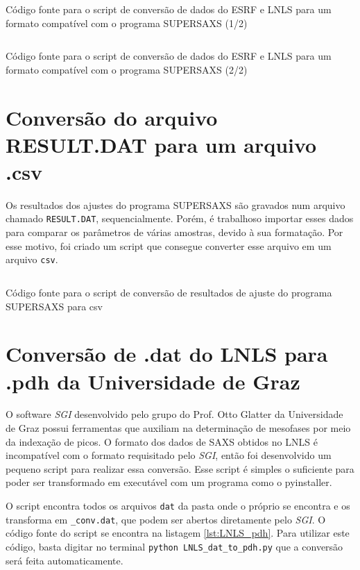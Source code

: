 \begin{apendicesenv}
\begin{listing}[H]
	\inputminted{python}{./python/converting_files1.py}
	\caption{Código fonte para o script de conversão de dados do ESRF e LNLS para um formato compatível com o programa SUPERSAXS (1/2)}  
	\label{lst:conversao_supersaxs1}
\end{listing}

\begin{listing}[H]
	\inputminted{python}{./python/converting_files2.py}
	\caption{Código fonte para o script de conversão de dados do ESRF e LNLS para um formato compatível com o programa SUPERSAXS (2/2)}  
	\label{lst:conversao_supersaxs2}
\end{listing}

\section{Conversão do arquivo RESULT.DAT para um arquivo .csv}

Os resultados dos ajustes do programa SUPERSAXS são gravados num arquivo chamado \texttt{RESULT.DAT}, sequencialmente. Porém, é trabalhoso importar esses dados para comparar os parâmetros de várias amostras, devido à sua formatação. Por esse motivo, foi criado um script que consegue converter esse arquivo em um arquivo \texttt{csv}.

\begin{listing}[H]
	\inputminted{python}{./python/converting_results.py}
	\caption{Código fonte para o script de conversão de resultados de ajuste do programa SUPERSAXS para csv}  
	\label{lst:conversao_resultados}
\end{listing}

\section{Conversão de .dat do LNLS para .pdh da Universidade de Graz}

O software \emph{SGI} desenvolvido pelo grupo do Prof. Otto Glatter da Universidade de Graz possui ferramentas que auxiliam na determinação de mesofases por meio da indexação de picos. O formato dos dados de SAXS obtidos no LNLS é incompatível com o formato requisitado pelo \emph{SGI}, então foi desenvolvido um pequeno script para realizar essa conversão. Esse script é simples o suficiente para poder ser transformado em executável com um programa como o pyinstaller.

O script encontra todos os arquivos \texttt{dat} da pasta onde o próprio se encontra e os transforma em \texttt{\_conv.dat}, que podem ser abertos diretamente pelo \emph{SGI}. O código fonte do script se encontra na listagem \ref{lst:LNLS_pdh}. Para utilizar este código, basta digitar no terminal \texttt{python LNLS\_dat\_to\_pdh.py} que a conversão será feita automaticamente.


\end{apendicesenv}
